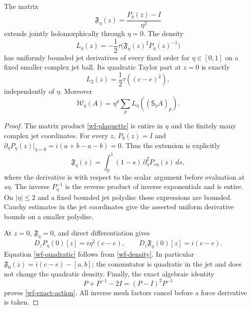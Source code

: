 \begin{lemma}\label{wf-removable}
The matrix
\[
 \mathfrak F_\eta(z)=\frac{P_\eta(z)-I}{\eta^2}
\]
extends jointly holomorphically through $\eta=0$. The density
\begin{equation}\label{wf-density}
 L_\eta(z)=-\frac12\tau\bigl(\mathfrak F_\eta(z)^2
                                              P_\eta(z)^{-1}\bigr)
\end{equation}
has uniformly bounded jet derivatives of every fixed order
for $\eta\in[0,1]$ on a fixed smaller complex jet ball. Its
quadratic Taylor part at $z=0$ is exactly
\begin{equation}\label{wf-quadratic}
 L_2(z)=\frac12\tau((c-e)^2),
\end{equation}
independently of $\eta$. Moreover
\begin{equation}\label{wf-exact-action}
 \mathcal W_\eta(A)=\eta^d\sum_p
                           L_\eta((\mathsf S_\eta A)_p).
\end{equation}
\end{lemma}

\begin{proof}
The matrix product \eqref{wf-plaquette} is entire in $\eta$
and the finitely many complex jet coordinates. For every $z$,
$P_0(z)=I$ and
$\partial_\eta P_\eta(z)|_{\eta=0}=i(a+b-a-b)=0$.
Thus the extension is explicitly
\begin{equation}\label{wf-removable-integral}
 \mathfrak F_\eta(z)
  =\int_0^1(1-s)\,\partial_\eta^2P_{s\eta}(z)\,ds,
\end{equation}
where the derivative is with respect to the scalar argument
before evaluation at $s\eta$. The inverse $P_\eta^{-1}$ is
the reverse product of inverse exponentials and is entire.
On $|\eta|\le2$ and a fixed bounded jet polydisc these
expressions are bounded. Cauchy estimates in the jet
coordinates give the asserted uniform derivative bounds
on a smaller polydisc.

At $z=0$, $\mathfrak F_\eta=0$, and direct differentiation
gives
\begin{equation}\label{wf-linear-F}
 D_zP_\eta(0)[z]=i\eta^2(c-e),\qquad
 D_z\mathfrak F_\eta(0)[z]=i(c-e).
\end{equation}
Equation \eqref{wf-quadratic} follows from
\eqref{wf-density}. In particular
$\mathfrak F_0(z)=i(c-e)-[a,b]$; the commutator is quadratic
in the jet and does not change the quadratic density.
Finally, the exact algebraic identity
\[
 P+P^{-1}-2I=(P-I)^2P^{-1}
\]
proves \eqref{wf-exact-action}. All inverse mesh factors
cancel before a force derivative is taken.
\end{proof}

